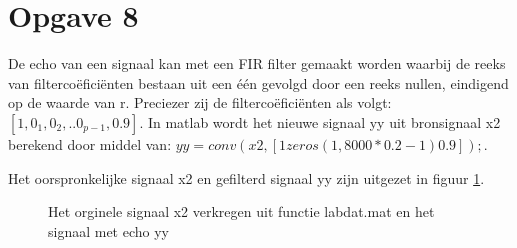\documentclass{article}
\begin{document}
\newpage
\section{Opgave 8}
De echo van een signaal kan met een FIR filter gemaakt worden waarbij de reeks van filterco\"efici\"enten bestaan uit een \'e\'en gevolgd door een reeks nullen, eindigend op de waarde van r. Preciezer zij de filterco\"efici\"enten als volgt: $[1, 0_1, 0_2, .. 0_{p-1}, 0.9]$. In matlab wordt het nieuwe signaal yy uit bronsignaal x2 berekend door middel van: $yy = conv(x2, [1 zeros(1,8000*0.2 - 1) 0.9]);$. 

Het oorspronkelijke signaal x2 en gefilterd signaal yy zijn uitgezet in figuur \ref{fig:opgave8}.

%
%
%
%

\begin{figure}[h]
  \centering
  \caption{Het orginele signaal x2 verkregen uit functie labdat.mat en het signaal met echo yy}
  \label{fig:opgave8}
\end{figure}
\end{document}
